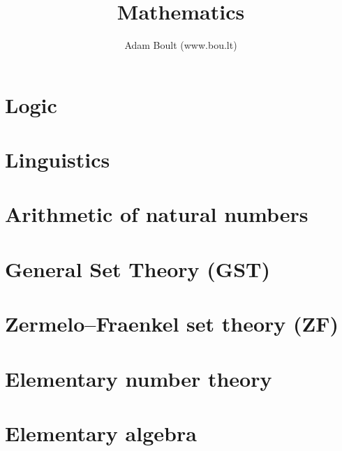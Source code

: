 \documentclass[oneside]{book}
\begin{document}
\author{Adam Boult (www.bou.lt)}
\title{Mathematics}
\maketitle

\setcounter{tocdepth}{0}
\tableofcontents



\part{Logic}






\part{Linguistics}


\part{Arithmetic of natural numbers}













\part{General Set Theory (GST)}






\part{Zermelo–Fraenkel set theory (ZF)}





\part{Elementary number theory}







\part{Elementary algebra}




\end{document}
